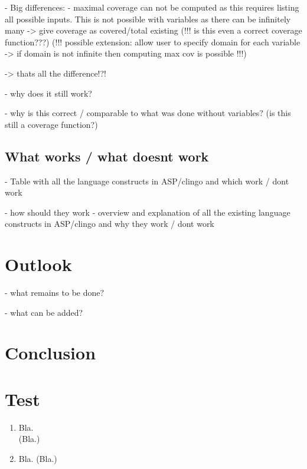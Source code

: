 - Big differences: 
    - maximal coverage can not be computed as this requires listing all possible inputs. This is not possible with variables 
    as there can be infinitely many -> give coverage as covered/total existing (!!! is this even a correct coverage function???)
(!!! possible extension: allow user to specify domain for each variable -> if domain is not infinite then computing max cov is possible !!!) 

-> thats all the difference!?!

- why does it still work?

- why is this correct / comparable to what was done without variables? (is this still a coverage function?)

\section{What works / what doesnt work}     %
\label{sec:Implementation/What Works}
- Table with all the language constructs in ASP/clingo and which work / dont work

- how should they work
- overview and explanation of all the existing language constructs in ASP/clingo and why they work / dont work

\chapter{Outlook}
\label{ch:Outlook}
- what remains to be done? 

- what can be added?


\chapter{Conclusion}
\label{ch:Conclusion}



\chapter{Test}
\label{ch:Test}

\begin{enumerate}
    \item Bla.\\
    (Bla.)
    \item Bla. (Bla.)
\end{enumerate}

